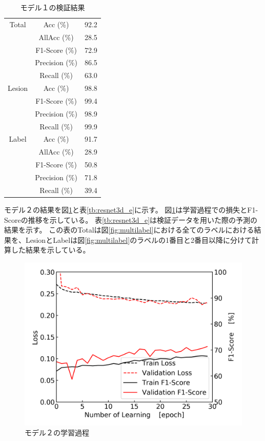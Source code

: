 \begin{table}[tb]
    \caption[]{モデル１の検証結果}
    \label{tb:resnet3d}
    \centering
    \normalsize
    \begin{tabular}{c|c|r} \hline
        Total & Acc (\%) & 92.2 \\ \cline{2-3}
         & AllAcc (\%) & 28.5 \\ \cline{2-3}
         & F1-Score (\%) & 72.9 \\ \cline{2-3}
         & Precision (\%) & 86.5 \\ \cline{2-3}
         & Recall (\%) & 63.0 \\ \hline
        Lesion & Acc (\%) & 98.8 \\ \cline{2-3}
         & F1-Score (\%) & 99.4 \\ \cline{2-3}
         & Precision (\%) & 98.9 \\ \cline{2-3}
         & Recall (\%) & 99.9 \\ \hline
        Label & Acc (\%) & 91.7 \\ \cline{2-3}
         & AllAcc (\%) & 28.9 \\ \cline{2-3}
         & F1-Score (\%) & 50.8 \\ \cline{2-3}
         & Precision (\%) & 71.8 \\ \cline{2-3}
         & Recall (\%) & 39.4 \\ \hline
    \end{tabular}
\end{table}

\newpage
モデル２の結果を図\ref{fig:resnet3d_e_result_process}と表\ref{tb:resnet3d_e}に示す。
図\ref{fig:resnet3d_e_result_process}は学習過程での損失とF1-Scoreの推移を示している。
表\ref{tb:resnet3d_e}は検証データを用いた際の予測の結果を示す。
この表のTotalは図\ref{fig:multilabel}における全てのラベルにおける結果を、LesionとLabelは図\ref{fig:multilabel}のラベルの1番目と2番目以降に分けて計算した結果を示している。

\begin{figure}[htbp]
    \begin{center}
        \includegraphics[width=150mm]{./fig/resnet3d_eprocess.png}
        \caption{モデル２の学習過程}
        \label{fig:resnet3d_e_result_process}
    \end{center}
\end{figure}

